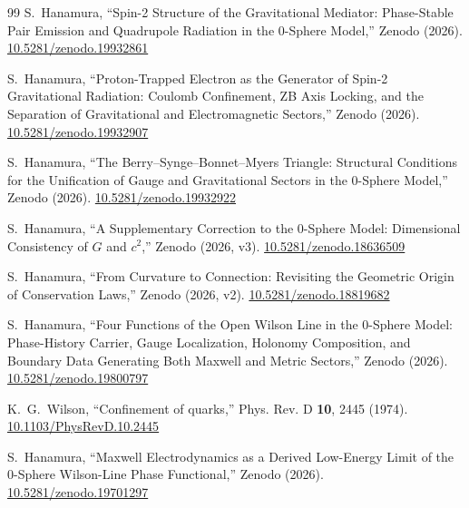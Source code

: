 \documentclass[%
 reprint, amsmath,amssymb, aps, prb, ]{revtex4-2}
\numberwithin{equation}{section}
\begin{document}
\begin{thebibliography}{99}
S.~Hanamura, ``Spin-2 Structure of the Gravitational Mediator: Phase-Stable Pair Emission and Quadrupole Radiation in the 0-Sphere Model,'' Zenodo (2026). \href{https://doi.org/10.5281/zenodo.19932861}{10.5281/zenodo.19932861}

S.~Hanamura, ``Proton-Trapped Electron as the Generator of Spin-2 Gravitational Radiation: Coulomb Confinement, ZB Axis Locking, and the Separation of Gravitational and Electromagnetic Sectors,'' Zenodo (2026). \href{https://doi.org/10.5281/zenodo.19932907}{10.5281/zenodo.19932907}

S.~Hanamura, ``The Berry--Synge--Bonnet--Myers Triangle: Structural Conditions for the Unification of Gauge and Gravitational Sectors in the 0-Sphere Model,'' Zenodo (2026). \href{https://doi.org/10.5281/zenodo.19932922}{10.5281/zenodo.19932922}

S.~Hanamura, ``A Supplementary Correction to the 0-Sphere Model: Dimensional Consistency of $G$ and $c^2$,'' Zenodo (2026, v3). \href{https://doi.org/10.5281/zenodo.18636509}{10.5281/zenodo.18636509}

S.~Hanamura, ``From Curvature to Connection: Revisiting the Geometric Origin of Conservation Laws,'' Zenodo (2026, v2). \href{https://doi.org/10.5281/zenodo.18819682}{10.5281/zenodo.18819682}

S.~Hanamura, ``Four Functions of the Open Wilson Line in the 0-Sphere Model: Phase-History Carrier, Gauge Localization, Holonomy Composition, and Boundary Data Generating Both Maxwell and Metric Sectors,'' Zenodo (2026). \href{https://doi.org/10.5281/zenodo.19800797}{10.5281/zenodo.19800797}

K.~G.~Wilson, ``Confinement of quarks,'' Phys. Rev. D \textbf{10}, 2445 (1974). \href{https://doi.org/10.1103/PhysRevD.10.2445}{10.1103/PhysRevD.10.2445}

S.~Hanamura, ``Maxwell Electrodynamics as a Derived Low-Energy Limit of the 0-Sphere Wilson-Line Phase Functional,'' Zenodo (2026). \href{https://doi.org/10.5281/zenodo.19701297}{10.5281/zenodo.19701297}


\end{thebibliography}
\end{document}
